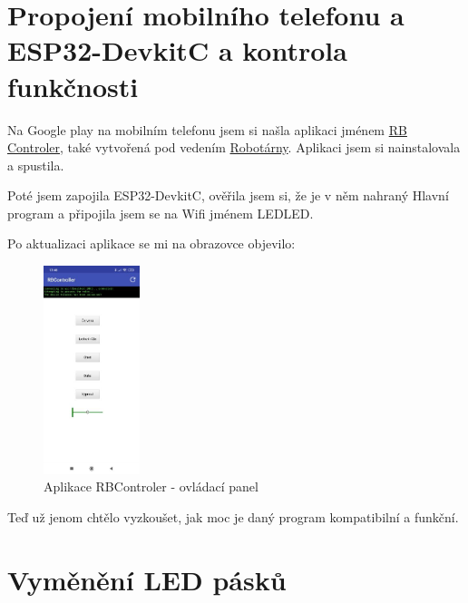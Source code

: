 



\newpage

\section{Propojení mobilního telefonu a ESP32-DevkitC a kontrola funkčnosti}
Na Google play na mobilním telefonu jsem si našla aplikaci jménem \href{https://play.google.com/store/apps/details?id=com.tassadar.rbcontroller}{RB Controler}, také vytvořená pod vedením \href{https://helceletka.cz/robotarna/}{Robotárny}. Aplikaci jsem si nainstalovala a spustila.

Poté jsem zapojila ESP32-DevkitC, ověřila jsem si, že je v něm nahraný Hlavní program a připojila jsem se na Wifi jménem LEDLED. 

Po aktualizaci aplikace se mi na obrazovce objevilo:


\begin{figure}[htbp]
	\centering
	\includegraphics[width=0.25\textwidth]{img/Screenshot- rbcontroller.jpg}
	\caption{Aplikace RBControler - ovládací panel}
\end{figure}



Teď už jenom chtělo vyzkoušet, jak moc je daný program kompatibilní a funkční.
 


\section{Vyměnění LED pásků}

